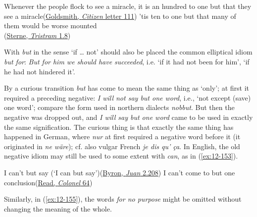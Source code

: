 \ea \label{ex:12-143b}
\ea
Whenever the people flock to see a miracle, it is an hundred to one but that they see a miracle\hfill(\href{https://archive.org/details/dli.ernet.504176/page/295/mode/2up?q=%22the+people+flock%22&view=theater}{Goldsmith, \textit{Citizen} letter 111}) %
\ex
'tis ten to one but that many of them would be worse mounted\\\hfill(\href{https://www.gutenberg.org/files/39270/39270-h/39270-h.htm#page11}{Sterne, \textit{Tristram} 1.8}) %
\z
\z

\label{but_for}With \textit{but} in the sense `if {\dots} not' should also be placed the common elliptical idiom \textit{but for}: \textit{But for him we should have succeeded}, i.e. `if it had not been for him', `if he had not hindered it'.

\bigskip
{}
\label{12-nobbut}By a curious transition \textit{but} has come to mean the same thing as `only'; at first it required a preceding negative: \textit{I will not say but one word}, i.e., `not except (save) one word'; compare the form used in northern dialects 
\textit{nobbut}. But then the negative was dropped out, and \textit{I will say but one word} came to be used in exactly the same signification. The curious thing is that exactly the same thing has happened in German, where 
\textit{nur} at first required a negative word before it (it originated in \textit{ne wäre}); cf. also vulgar French \textit{je dis qu' ça}. In English, the old negative idiom may still be used to some extent with \textit{can}, as in (\ref{ex:12-153}).

\ea \label{ex:12-153}
\ea
I can't but say \phantom{x} (`I can but say')\hfill(\href{https://archive.org/details/workslordbyron10unkngoog/page/140/mode/2up?view=theater&q=%22can%27t+but+say%22}{Byron, \textit{Juan} 2.208}) %
\ex
I can't come to but one conclusion\hfill(\href{https://archive.org/details/kentuckycolonel00readrich/page/64/mode/2up?q=%22can%27t+come+to+but+one+conclusion%22&view=theater}{Read, \textit{Colonel} 64})
\z
\z

Similarly, in (\ref{ex:12-155}), the words \textit{for no purpose} might be omitted without changing the meaning of the whole.

